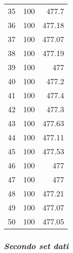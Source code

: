 \documentclass[a4paper]{article}
\begin{document}
\begin{center}
\begin{tabular}{|c|lr|}
			35	&	100	&	477.7	\\
			36	&	100	&	477.18	\\
			37	&	100	&	477.07	\\
			38	&	100	&	477.19	\\
			39	&	100	&	477	\\
			40	&	100	&	477.2	\\
			41	&	100	&	477.4	\\
			42	&	100	&	477.3	\\
			43	&	100	&	477.63	\\
			44	&	100	&	477.11	\\
			45	&	100	&	477.53	\\
			46	&	100	&	477	\\
			47	&	100	&	477	\\
			48	&	100	&	477.21	\\
			49	&	100	&	477.07	\\
			50	&	100	&	477.05	\\
			\bottomrule
		\end{tabular}
	\end{center}

	
		\subsubsection*{\textit{Secondo set dati}}
	
\end{document}

